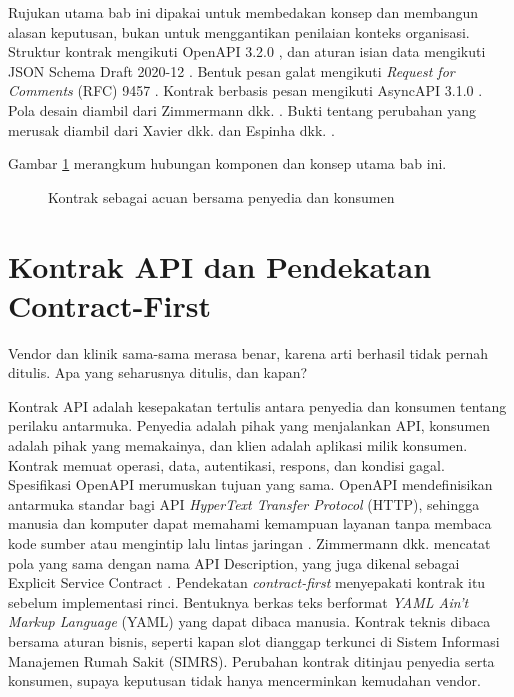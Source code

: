 Rujukan utama bab ini dipakai untuk membedakan konsep dan membangun alasan keputusan, bukan untuk menggantikan penilaian konteks
organisasi. Struktur kontrak mengikuti OpenAPI 3.2.0 \cite{openapi32}, dan aturan isian data mengikuti JSON Schema Draft 2020-12
\cite{c09-jsonschema-validation}. Bentuk pesan galat mengikuti \textit{Request for Comments} (RFC) 9457 \cite{rfc9457}. Kontrak
berbasis pesan mengikuti AsyncAPI 3.1.0 \cite{asyncapi31}. Pola desain diambil dari Zimmermann dkk. \cite{zimmermann2022patterns}.
Bukti tentang perubahan yang merusak diambil dari Xavier dkk. \cite{c09-xavier2017} dan Espinha dkk. \cite{espinha2014}.

Gambar \ref{fig:ch09-ilustrasi-bab} merangkum hubungan komponen dan konsep utama bab ini.
\begin{figure}[!htb]
  \centering
  
  \caption{Kontrak sebagai acuan bersama penyedia dan konsumen}
  \label{fig:ch09-ilustrasi-bab}
\end{figure}

\section{Kontrak API dan Pendekatan Contract-First}

Vendor dan klinik sama-sama merasa benar, karena arti berhasil tidak pernah ditulis. Apa yang seharusnya ditulis, dan kapan?

Kontrak API adalah kesepakatan tertulis antara penyedia dan konsumen tentang perilaku antarmuka. Penyedia adalah pihak yang
menjalankan API, konsumen adalah pihak yang memakainya, dan klien adalah aplikasi milik konsumen. Kontrak memuat operasi, data,
autentikasi, respons, dan kondisi gagal. Spesifikasi OpenAPI merumuskan tujuan yang sama. OpenAPI mendefinisikan antarmuka standar
bagi API \textit{HyperText Transfer Protocol} (HTTP), sehingga manusia dan komputer dapat memahami kemampuan layanan tanpa membaca
kode sumber atau mengintip lalu lintas jaringan \cite{openapi32}. Zimmermann dkk. mencatat pola yang sama dengan nama API Description,
yang juga dikenal sebagai Explicit Service Contract \cite{zimmermann2022patterns}. Pendekatan \textit{contract-first} menyepakati
kontrak itu sebelum implementasi rinci. Bentuknya berkas teks berformat \textit{YAML Ain't Markup Language} (YAML) yang dapat dibaca
manusia. Kontrak teknis dibaca bersama aturan bisnis, seperti kapan slot dianggap terkunci di Sistem Informasi Manajemen Rumah Sakit
(SIMRS). Perubahan kontrak ditinjau penyedia serta konsumen, supaya keputusan tidak hanya mencerminkan kemudahan vendor.

